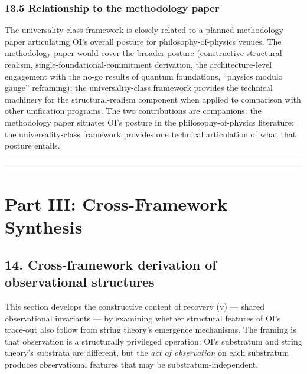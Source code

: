 \documentclass[
]{article}
\begin{document}
\hypertarget{relationship-to-the-methodology-paper}{%
\subsubsection{13.5 Relationship to the methodology
paper}\label{relationship-to-the-methodology-paper}}

The universality-class framework is closely related to a planned
methodology paper articulating OI's overall posture for
philosophy-of-physics venues. The methodology paper would cover the
broader posture (constructive structural realism,
single-foundational-commitment derivation, the architecture-level
engagement with the no-go results of quantum foundations, ``physics
modulo gauge'' reframing); the universality-class framework provides the
technical machinery for the structural-realism component when applied to
comparison with other unification programs. The two contributions are
companions: the methodology paper situates OI's posture in the
philosophy-of-physics literature; the universality-class framework
provides one technical articulation of what that posture entails.

\begin{center}\rule{0.5\linewidth}{0.5pt}\end{center}

\begin{center}\rule{0.5\linewidth}{0.5pt}\end{center}

\hypertarget{part-iii-cross-framework-synthesis}{%
\section{Part III: Cross-Framework
Synthesis}\label{part-iii-cross-framework-synthesis}}

\hypertarget{cross-framework-derivation-of-observational-structures}{%
\subsection{14. Cross-framework derivation of observational
structures}\label{cross-framework-derivation-of-observational-structures}}

This section develops the constructive content of recovery (v) ---
shared observational invariants --- by examining whether structural
features of OI's trace-out also follow from string theory's emergence
mechanisms. The framing is that observation is a structurally privileged
operation: OI's substratum and string theory's substrata are different,
but the \emph{act of observation} on each substratum produces
observational features that may be substratum-independent.
\end{document}
